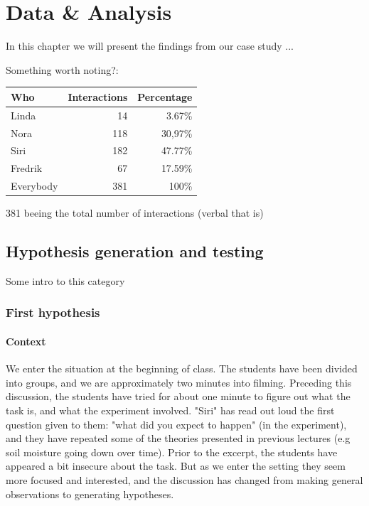 \chapter{Data \& Analysis}
In this chapter we will present the findings from our case study ...

Something worth noting?:
\begin{table}[H]
\begin{center}
	\begin{tabular}{l r r } \toprule
	Who &  Interactions  & Percentage\\ \midrule  
	Linda &	 14  & 3.67\% \\
	Nora&	118 & 30,97\% \\ 
	Siri& 	182 & 47.77\% \\
	Fredrik& 67 & 17.59\% \\ \midrule
	Everybody &	381 & 100\%\\
	\bottomrule
	\end{tabular}
\end{center}
\end{table}
381 beeing the total number of interactions (verbal that is)



\section{Hypothesis generation and testing}
Some intro to this category
\subsection{First hypothesis}
\subsubsection*{Context}
\label{firsthypothesis}
We enter the situation at the beginning of class. The students have been divided into groups, and we are approximately two minutes into filming. Preceding this discussion, the students have tried for about one minute to figure out what the task is, and what the experiment involved. "Siri" has read out loud the first question given to them: "what did you expect to happen" (in the experiment), and they have repeated some of the theories presented in previous lectures (e.g soil moisture going down over time). Prior to the excerpt, the students have appeared a bit insecure about the task. But as we enter the setting they seem more focused and interested, and the discussion has changed from making general observations to generating hypotheses.

